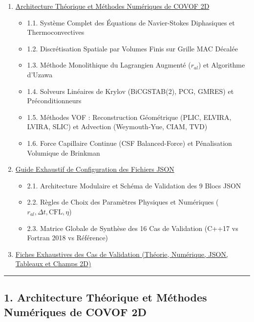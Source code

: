 \documentclass[
  10pt,
]{article}
\providecommand{\tightlist}{%
  \setlength{\itemsep}{0pt}\setlength{\parskip}{0pt}}
\begin{document}
\begin{enumerate}
\def\labelenumi{\arabic{enumi}.}
\tightlist
\item
  \hyperref[1-architecture-thuxe9orique-et-muxe9thodes-numuxe9riques-de-covof-2d]{Architecture
  Théorique et Méthodes Numériques de COVOF 2D}

  \begin{itemize}
  \tightlist
  \item
    1.1. Système Complet des Équations de Navier-Stokes Diphasiques et
    Thermoconvectives
  \item
    1.2. Discrétisation Spatiale par Volumes Finis sur Grille MAC
    Décalée
  \item
    1.3. Méthode Monolithique du Lagrangien Augmenté (\(r_{al}\)) et
    Algorithme d'Uzawa
  \item
    1.4. Solveurs Linéaires de Krylov (BiCGSTAB(2), PCG, GMRES) et
    Préconditionneurs
  \item
    1.5. Méthodes VOF : Reconstruction Géométrique (PLIC, ELVIRA, LVIRA,
    SLIC) et Advection (Weymouth-Yue, CIAM, TVD)
  \item
    1.6. Force Capillaire Continue (CSF Balanced-Force) et Pénalisation
    Volumique de Brinkman
  \end{itemize}
\item
  \hyperref[2-guide-exhaustif-de-configuration-des-fichiers-json]{Guide
  Exhaustif de Configuration des Fichiers JSON}

  \begin{itemize}
  \tightlist
  \item
    2.1. Architecture Modulaire et Schéma de Validation des 9 Blocs JSON
  \item
    2.2. Règles de Choix des Paramètres Physiques et Numériques
    (\(r_{al}, \Delta t, \text{CFL}, \eta\))
  \item
    2.3. Matrice Globale de Synthèse des 16 Cas de Validation (C++17 vs
    Fortran 2018 vs Référence)
  \end{itemize}
\item
  \hyperref[3-fiches-exhaustives-des-cas-de-validation]{Fiches
  Exhaustives des Cas de Validation (Théorie, Numérique, JSON, Tableaux
  et Champs 2D)}
\end{enumerate}

\begin{center}\rule{0.5\linewidth}{0.5pt}\end{center}

\subsection{1. Architecture Théorique et Méthodes Numériques de COVOF
2D}\label{architecture-thuxe9orique-et-muxe9thodes-numuxe9riques-de-covof-2d}
\end{document}
